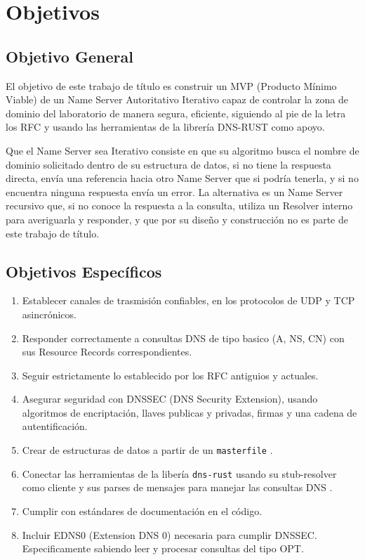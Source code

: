 \section{Objetivos}

\subsection*{Objetivo General}

El objetivo de este trabajo de título es construir un MVP (Producto Mínimo Viable) de un Name Server Autoritativo Iterativo capaz de controlar la zona de 
dominio del laboratorio de manera segura, eficiente, siguiendo al pie de la letra los RFC y usando las herramientas de la librería DNS-RUST como 
apoyo.

Que el Name Server sea Iterativo consiste en que su algoritmo busca el nombre de dominio solicitado dentro de su estructura de datos, si no 
tiene la respuesta directa, envía una referencia hacia otro Name Server que si podría tenerla, y si no encuentra ninguna respuesta envía un 
error. La alternativa es un Name Server recursivo que, si no conoce la respuesta a la consulta, utiliza un Resolver interno para averiguarla y 
responder, y que por su diseño y construcción no es parte de este trabajo de título.

\subsection*{Objetivos Específicos}\label{sec:obj-e}

\begin{enumerate}
\item Establecer canales de trasmisión confiables, en los protocolos de UDP y TCP asincrónicos.
\item Responder correctamente a consultas DNS de tipo basico (A, NS, CN) con sus Resource Records correspondientes.
\item Seguir estrictamente lo establecido por los RFC antiguios y actuales.
\item Asegurar seguridad con DNSSEC (DNS Security Extension), usando algoritmos de encriptación, llaves publicas y privadas, firmas y una cadena de autentificación.
\item Crear de estructuras de datos a partir de un \texttt{masterfile} .
\item Conectar las herramientas de la libería \texttt{dns-rust} usando su stub-resolver como cliente y sus parses de mensajes para manejar las consultas DNS .
\item Cumplir con estándares de documentación en el código.
\item Incluir EDNS0 (Extension DNS 0) necesaria para cumplir DNSSEC. Especificamente sabiendo leer y procesar consultas del tipo OPT.

\end{enumerate}


